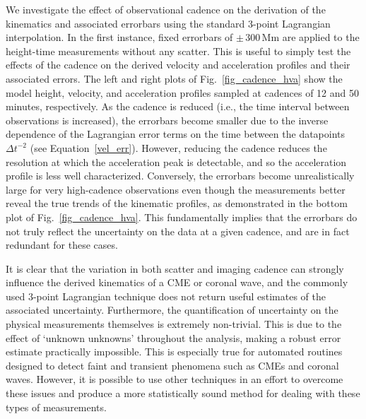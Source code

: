 \documentclass[referee]{aa}
\begin{document}
We investigate the effect of observational cadence on the derivation of the kinematics and associated errorbars using the standard 3-point Lagrangian interpolation. In the first instance, fixed errorbars of $\pm\,300$\,Mm are applied to the height-time measurements without any scatter. This is useful to simply test the effects of the cadence on the derived velocity and acceleration profiles and their associated errors. The left and right plots of Fig.~\ref{fig_cadence_hva} show the model height, velocity, and acceleration profiles sampled at cadences of 12 and 50\,minutes, respectively. As the cadence is reduced (i.e., the time interval between observations is increased), the errorbars become smaller due to the inverse dependence of the Lagrangian error terms on the time between the datapoints $\Delta t^{-2}$ (see Equation~\ref{vel_err}). However, reducing the cadence reduces the resolution at which the acceleration peak is detectable, and so the acceleration profile is less well characterized. Conversely, the errorbars become unrealistically large for very high-cadence observations even though the measurements better reveal the true trends of the kinematic profiles, as demonstrated in the bottom plot of Fig.~\ref{fig_cadence_hva}. This fundamentally implies that the errorbars do not truly reflect the uncertainty on the data at a given cadence, and are in fact redundant for these cases.



It is clear that the variation in both scatter and imaging cadence can strongly influence the derived kinematics of a CME or coronal wave, and the commonly used 3-point Lagrangian technique does not return useful estimates of the associated uncertainty. Furthermore, the quantification of uncertainty on the physical measurements themselves is extremely non-trivial. This is due to the effect of `unknown unknowns' throughout the analysis, making a robust error estimate practically impossible. This is especially true for automated routines designed to detect faint and transient phenomena such as CMEs and coronal waves. However, it is possible to use other techniques in an effort to overcome these issues and produce a more statistically sound method for dealing with these types of measurements.
\end{document}
